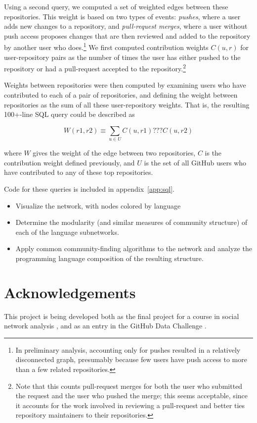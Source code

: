 \documentclass[twocolumn]{article}
\begin{document}
Using a second query, we computed a set of weighted edges between these
repositories. This weight is based on two types of events: \emph{pushes}, where
a user adds new changes to a repository, and \emph{pull-request merges}, where a
user without push access proposes changes that are then reviewed and added to
the repository by another user who does.\footnote{In preliminary analysis,
accounting only for pushes resulted in a relatively disconnected graph,
presumably because few users have push access to more than a few related
repositories.} We first computed contribution weights $C(u, r)$ for
user-repository pairs as the number of times the user has either pushed to the
repository or had a pull-request accepted to the repository.\footnote{Note that
this counts pull-request merges for both the user who submitted the request and
the user who pushed the merge; this seems acceptable, since it accounts for the
work involved in reviewing a pull-request and better ties repository maintainers
to their repositories.}

Weights between repositories were then computed by examining users who have
contributed to each of a pair of repositories, and defining the weight between
repositories as the sum of all these user-repository weights. That is, the
resulting 100+-line SQL query could be described as

\begin{equation}
    W(r1, r2) \equiv \sum_{u \in U} C(u, r1) ??? C(u, r2)
\end{equation}

where $W$ gives the weight of the edge between two repositories, $C$ is the
contribution weight defined previously, and $U$ is the set of all GitHub users
who have contributed to any of these top repositories.

Code for these queries is included in appendix~\ref{app:sql}.

\begin{itemize}
    \item Visualize the network, with nodes colored by language
    \item Determine the modularity (and similar measures of community structure)
        of each of the language subnetworks.
    \item Apply common community-finding algorithms to the network and analyze
        the programming language composition of the resulting structure.
\end{itemize}

\section{Acknowledgements}
This project is being developed both as the final project for a course in social
network analysis \cite{snacourse}, and as an entry in the GitHub Data Challenge
\cite{doll13}.
\end{document}
